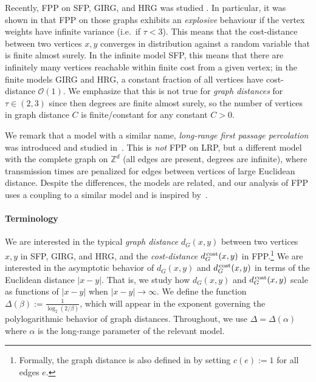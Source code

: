 \documentclass[11pt, letterpaper, margin=1in]{amsart}
\theoremstyle{definition}
\theoremstyle{remark}
\newcommand{\ZZ}{\mathbb{Z}}
\newcommand{\dg}[2]{\ensuremath{ \ensuremath{ d_G(#1, #2) } }}
\newcommand{\SFFPP}{FPP\xspace}
\newcommand{\graphdistcost}[2]{d^{\hspace{.05cm}\text{cost}}_{G}(#1, #2)}
\numberwithin{equation}{section}
\begin{document}
Recently, FPP on SFP, GIRG, and HRG was studied \cite{komjathy2020explosion, komjathy2023four, komjathy2023fourtwo, completeFPP}. 
In particular, it was shown in \cite{komjathy2020explosion, komjathy2023four} that \SFFPP on those graphs exhibits an \emph{explosive} behaviour if the vertex weights have infinite variance (i.e.\ if $\tau <3$). This means that the cost-distance between two vertices $x,y$ converges in distribution against a random variable that is finite almost surely. In the infinite model SFP, this means that there are infinitely many vertices reachable within finite cost from a given vertex; in the finite models GIRG and HRG, a constant fraction of all vertices have cost-distance $\mathcal{O}(1)$. We emphasize that this is not true for \emph{graph distances} for $\tau\in (2,3)$ since then degrees are finite almost surely, so the number of vertices in graph distance $C$ is finite/constant for any constant $C>0$.

We remark that a model with a similar name, \emph{long-range first passage percolation} was introduced and studied in~\cite{completeFPP}. This is \emph{not} FPP on  LRP, but a different model with the complete graph on $\ZZ^d$ (all edges are present, degrees are infinite), where transmission times are penalized for edges between vertices of large Euclidean distance. Despite the differences, the models are related, and our analysis of FPP uses a coupling to a similar model and is inspired by~\cite{completeFPP}.

\paragraph{\textbf{Terminology}}

We are interested in the typical \emph{graph distance} $d_G(x,y)$ between two vertices $x,y$ in SFP, GIRG, and HRG, and the \emph{cost-distance} $\graphdistcost{x}{y}$ in FPP.\footnote{Formally, the graph distance is also defined in  by setting $c(e):= 1$ for all edges $e$.}
We are interested in the asymptotic behavior of $\dg{x}{y}$ and $\graphdistcost{x}{y}$ in terms of the Euclidean distance $|x- y|$. That is, we study how $\dg{x}{y}$ and $\graphdistcost{x}{y}$ scale as functions of $|x - y|$ when $|x - y| \rightarrow \infty$. We define the function $\Delta(\beta) := \frac{1}{\log_2(2/\beta)}$, which will appear in the exponent governing the polylogarithmic behavior of graph distances. Throughout, we use $\Delta = \Delta(\alpha)$ where $\alpha$ is the long-range parameter of the relevant model.
\end{document}
